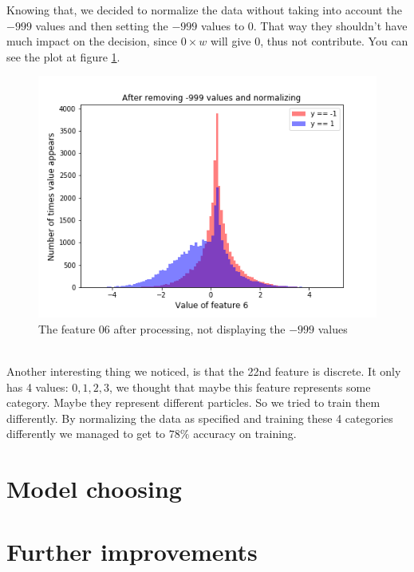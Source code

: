 \documentclass[10pt,conference,compsocconf]{IEEEtran}
\begin{document}
Knowing that, we decided to normalize the data without taking into account the $-999$ values and then setting the $-999$ values to $0$. That way they shouldn't have much impact on the decision, since $0 \times w$ will give 0, thus not contribute. You can see the plot at figure \ref{fig:feature-06-processed}.
\begin{figure}[h!]
	\centering
  \includegraphics[width=\columnwidth]{graph-features/feature-06-processed.png}
  \caption{The feature 06 after processing, not displaying the $-999$ values}
	\label{fig:feature-06-processed}
\end{figure}\\
Another interesting thing we noticed, is that the 22nd feature is discrete. It only has 4 values: ${0,1,2,3}$, we thought that maybe this feature represents some category. Maybe they represent different particles. So we tried to train them differently. By normalizing the data as specified and training these 4 categories differently we managed to get to $78\%$ accuracy on training.

\section{Model choosing}

\section{Further improvements}
\end{document}
